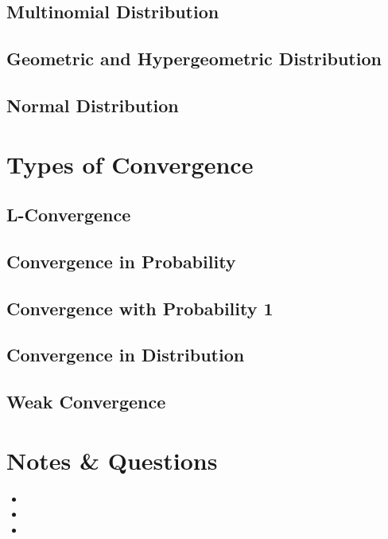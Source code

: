 \documentclass[11pt]{article}
\theoremstyle{quiet}
\theoremstyle{quietremark}
\newcommand{\1}{\mathbf{1}}            %
\begin{document}
\subsection{Multinomial Distribution}

\subsection{Geometric and Hypergeometric Distribution}

\subsection{Normal Distribution}

\newpage
\section{Types of Convergence}

\subsection{L-Convergence}

\subsection{Convergence in Probability}

\subsection{Convergence with Probability 1}

\subsection{Convergence in Distribution}

\subsection{Weak Convergence}

\newpage
\section*{Notes \& Questions}

\begin{tcolorbox}[colback=black!2, colframe=neutralColor!40, arc=1.5mm, breakable]
\begin{itemize}[leftmargin=*]
  \item[$\square$] 
  \item[$\square$] 
  \item[$\square$] 
\end{itemize}
\end{tcolorbox}
\end{document}
